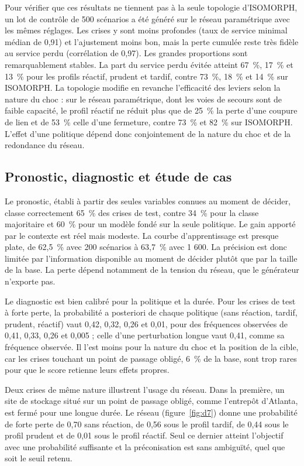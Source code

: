 Pour vérifier que ces résultats ne tiennent pas à la seule topologie d'ISOMORPH, un lot de contrôle de 500 scénarios a été généré sur le réseau paramétrique avec les mêmes réglages. Les crises y sont moins profondes (taux de service minimal médian de 0,91) et l'ajustement moins bon, mais la perte cumulée reste très fidèle au service perdu (corrélation de 0,97). Les grandes proportions sont remarquablement stables. La part du service perdu évitée atteint 67~\%, 17~\% et 13~\% pour les profils réactif, prudent et tardif, contre 73~\%, 18~\% et 14~\% sur ISOMORPH. La topologie modifie en revanche l'efficacité des leviers selon la nature du choc : sur le réseau paramétrique, dont les voies de secours sont de faible capacité, le profil réactif ne réduit plus que de 25~\% la perte d'une coupure de lien et de 53~\% celle d'une fermeture, contre 73~\% et 82~\% sur ISOMORPH. L'effet d'une politique dépend donc conjointement de la nature du choc et de la redondance du réseau.

\subsection{Pronostic, diagnostic et étude de cas}
\label{sec:S6.3}

Le pronostic, établi à partir des seules variables connues au moment de décider, classe correctement 65~\% des crises de test, contre 34~\% pour la classe majoritaire et 60~\% pour un modèle fondé sur la seule politique. Le gain apporté par le contexte est réel mais modeste. La courbe d'apprentissage est presque plate, de 62,5~\% avec 200 scénarios à 63,7~\% avec 1 600. La précision est donc limitée par l'information disponible au moment de décider plutôt que par la taille de la base. La perte dépend notamment de la tension du réseau, que le générateur n'exporte pas.

Le diagnostic est bien calibré pour la politique et la durée. Pour les crises de test à forte perte, la probabilité a posteriori de chaque politique (sans réaction, tardif, prudent, réactif) vaut 0,42, 0,32, 0,26 et 0,01, pour des fréquences observées de 0,41, 0,33, 0,26 et 0,005 ; celle d'une perturbation longue vaut 0,41, comme sa fréquence observée. Il l'est moins pour la nature du choc et la position de la cible, car les crises touchant un point de passage obligé, 6~\% de la base, sont trop rares pour que le score retienne leurs effets propres.

Deux crises de même nature illustrent l'usage du réseau. Dans la première, un site de stockage situé sur un point de passage obligé, comme l'entrepôt d'Atlanta, est fermé pour une longue durée. Le réseau (figure~\ref{fig:d7}) donne une probabilité de forte perte de 0,70 sans réaction, de 0,56 sous le profil tardif, de 0,44 sous le profil prudent et de 0,01 sous le profil réactif. Seul ce dernier atteint l'objectif avec une probabilité suffisante et la préconisation est sans ambiguïté, quel que soit le seuil retenu.

